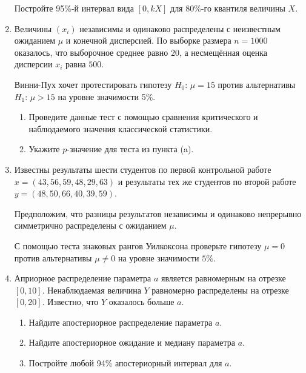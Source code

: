 \documentclass[12pt]{article}
\begin{document}
\begin{enumerate}
    Постройте 95\%-й интервал вида $[0, kX]$ для 80\%-го квантиля величины $X$. 

    \item Величины $(x_i)$ независимы и одинаково распределены с неизвестным ожиданием $\mu$ и конечной дисперсией.
    По выборке размера $n = 1000$ оказалось, что выборочное среднее равно $20$, 
    а несмещённая оценка дисперсии $x_i$ равна $500$.

    Винни-Пух хочет протестировать гипотезу $H_0$: $\mu = 15$ против альтернативы $H_1$: $\mu > 15$ на уровне значимости 5\%.
    \begin{enumerate}
        \item Проведите данные тест с помощью сравнения критического и наблюдаемого значения классической статистики. 
        \item Укажите $p$-значение для теста из пункта (a).
    \end{enumerate}

    \item Известны результаты шести студентов по первой контрольной работе $x = (43, 56, 59, 48, 29, 63)$ и 
    результаты тех же студентов по второй работе $y = (48, 50, 66, 40, 39, 59)$.

    Предположим, что разницы результатов независимы и одинаково непрерывно симметрично распределены с ожиданием $\mu$.

    С помощью теста знаковых рангов Уилкоксона проверьте гипотезу $\mu = 0$ против альтернативы $\mu \neq 0$ на уровне значимости $5\%$.


    \item Априорное распределение параметра $a$ является равномерным на отрезке $[0, 10]$.
    Ненаблюдаемая величина $Y$ равномерно распределены на отрезке $[0, 20]$.
    Известно, что $Y$ оказалось больше $a$.

    \begin{enumerate}
        \item Найдите апостериорное распределение параметра $a$. 
        \item Найдите апостериорное ожидание и медиану параметра $a$. 
        \item Постройте любой 94\% апостериорный интервал для $a$. 
    \end{enumerate}

\end{enumerate}
\end{document}
